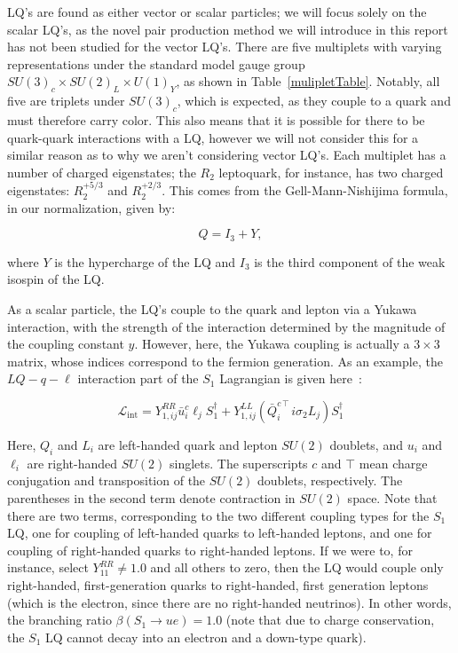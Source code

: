     LQ's are found as either vector or scalar particles; we will focus solely on the scalar LQ's, as the novel pair production method we will introduce in this report has not been studied for the vector LQ's. There are five multiplets with varying representations under the standard model gauge group $SU(3)_c \times SU(2)_L \times U(1)_Y$, as shown in Table~\ref{mulipletTable}. Notably, all five are triplets under $SU(3)_c$, which is expected, as they couple to a quark and must therefore carry color. This also means that it is possible for there to be quark-quark interactions with a LQ, however we will not consider this for a similar reason as to why we aren't considering vector LQ's. Each multiplet has a number of charged eigenstates; the $R_2$ leptoquark, for instance, has two charged eigenstates: $R_2^{+5/3}$ and $R_2^{+2/3}$. This comes from the Gell-Mann-Nishijima formula, in our normalization, given by:

    \begin{equation}
        Q = I_3 + Y,
    \end{equation}

    where $Y$ is the hypercharge of the LQ and $I_3$ is the third component of the weak isospin of the LQ.

    As a scalar particle, the LQ's couple to the quark and lepton via a Yukawa interaction, with the strength of the interaction determined by the magnitude of the coupling constant $y$. However, here, the Yukawa coupling is actually a $3\times3$ matrix, whose indices correspond to the fermion generation. As an example, the $LQ-q-\ell$ interaction part of the $S_1$ Lagrangian is given here~\cite{Crivellin_2022}:

    \begin{equation}
        \mathcal{L}_{\text{int}} = Y_{1,ij}^{RR} \bar{u}_i^c \ell_j S_1^{\dagger} + Y_{1,ij}^{LL} \left(\bar{Q}_i^{c\intercal} i\sigma_2 L_j \right) S_1^{\dagger}
    \end{equation}

    Here, $Q_i$ and $L_i$ are left-handed quark and lepton $SU(2)$ doublets, and $u_i$ and $\ell_i$ are right-handed $SU(2)$ singlets. The superscripts $c$ and $\intercal$ mean charge conjugation and transposition of the $SU(2)$ doublets, respectively. The parentheses in the second term denote contraction in $SU(2)$ space. Note that there are two terms, corresponding to the two different coupling types for the $S_1$ LQ, one for coupling of left-handed quarks to left-handed leptons, and one for coupling of right-handed quarks to right-handed leptons. If we were to, for instance, select $Y^{RR}_{11} \neq 1.0$ and all others to zero, then the LQ would couple only right-handed, first-generation quarks to right-handed, first generation leptons (which is the electron, since there are no right-handed neutrinos). In other words, the branching ratio $\beta(S_1 \rightarrow ue)=1.0$ (note that due to charge conservation, the $S_1$ LQ cannot decay into an electron and a down-type quark).


